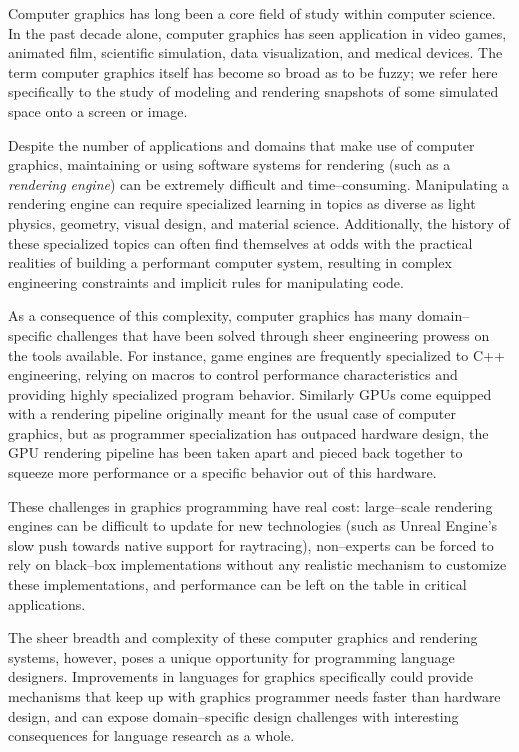 Computer graphics has long been a core field of study within computer science.  In the past decade alone, computer graphics has seen application in video games, animated film, scientific simulation, data visualization, and medical devices.  The term computer graphics itself has become so broad as to be fuzzy; we refer here specifically to the study of modeling and rendering snapshots of some simulated space onto a screen or image.

Despite the number of applications and domains that make use of computer graphics, maintaining or using software systems for rendering (such as a \emph{rendering engine}) can be extremely difficult and time--consuming.  Manipulating a rendering engine can require specialized learning in topics as diverse as light physics, geometry, visual design, and material science.  Additionally, the history of these specialized topics can often find themselves at odds with the practical realities of building a performant computer system, resulting in complex engineering constraints and implicit rules for manipulating code.

As a consequence of this complexity, computer graphics has many domain--specific challenges that have been solved through sheer engineering prowess on the tools available.  For instance, game engines are frequently specialized to C++ engineering, relying on macros to control performance characteristics and providing highly specialized program behavior.  Similarly GPUs come equipped with a rendering pipeline originally meant for the usual case of computer graphics, but as programmer specialization has outpaced hardware design, the GPU rendering pipeline has been taken apart and pieced back together to squeeze more performance or a specific behavior out of this hardware.

These challenges in graphics programming have real cost: large--scale rendering engines can be difficult to update for new technologies (such as Unreal Engine's slow push towards native support for raytracing), non--experts can be forced to rely on black--box implementations without any realistic mechanism to customize these implementations, and performance can be left on the table in critical applications.

The sheer breadth and complexity of these computer graphics and rendering systems, however, poses a unique opportunity for programming language designers.  Improvements in languages for graphics specifically could provide mechanisms that keep up with graphics programmer needs faster than hardware design, and can expose domain--specific design challenges with interesting consequences for language research as a whole.

